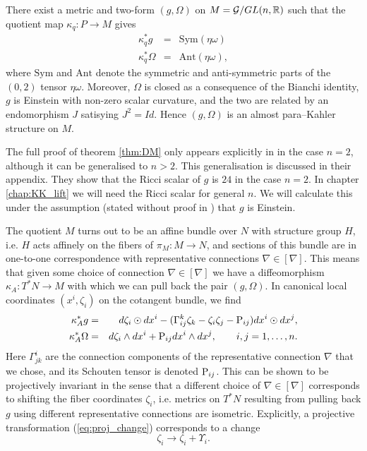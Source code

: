 \begin{theo}{\cite{DM}}\label{thm:DM}
There exist a metric and two-form
$(g,\Omega)$ on $\mbox{\ensuremath{M=\mathcal{G}/GL(n,\mathbb{R})}}$ such
that the quotient map $\kappa_q:P\rightarrow M$ gives
\begin{eqnarray} 
\kappa_q^{*}g & = & \mathrm{Sym}(\eta\omega) \label{eq:g_cartan} \\
\kappa_q^{*}\Omega & = & \mathrm{Ant}(\eta\omega), \label{eq:Omega_cartan}
\end{eqnarray}
where $\mathrm{Sym}$ and $\mathrm{Ant}$ denote the symmetric and
anti-symmetric parts of the $(0,2)$ tensor $\eta\omega$. Moreover,
$\Omega$ is closed as a consequence of the Bianchi identity, $g$
is Einstein with non-zero scalar curvature, and the two are related
by an endomorphism $J$ satisying $J^{2}=Id$. Hence $(g,\Omega)$
is an almost para--Kahler structure on $M$.
\end{theo}


\begin{rmk}
The full proof of theorem \ref{thm:DM} only appears explicitly in \cite{DM} in the case $n=2$, although it can be generalised to $n>2$. This generalisation is discussed in their appendix. They show that the Ricci scalar of $g$ is $24$ in the case $n=2$. In chapter \ref{chap:KK_lift} we will need the Ricci scalar for general $n$. We will calculate this under the assumption (stated without proof in \cite{DM}) that $g$ is Einstein.
\end{rmk}

\begin{rmk}
The quotient $M$ turns out to be an affine bundle over $N$ with
structure group $H$, i.e. $H$ acts affinely on the fibers of $\pi_M:M\rightarrow N$,
and sections of this bundle are in one-to-one correspondence with
representative connections $\nabla\in[\nabla]$. This means that given
some choice of connection $\nabla\in[\nabla]$ we have a diffeomorphism
$\kappa_A:T^{*}N\rightarrow M$ with which we can pull back the pair
$(g,\Omega)$. In canonical local coordinates $(x^{i},\zeta_{i})$ on
the cotangent bundle, we find
\begin{eqnarray}
\kappa_A^{*}g & = &  d\zeta_{i}\odot dx^{i}-(\Gamma_{ij}^{k}\zeta_{k}-\zeta_{i}\zeta_{j}-\mathrm{P}_{ij}) dx^{i}\odot dx^{j},\label{eq:coord_form}\\
\kappa_A^{*}\Omega & = &  d\zeta_{i}\wedge dx^{i}+\mathrm{P}_{ij} dx^{i}\wedge dx^{j},\qquad i,j=1,\dots ,n.\nonumber 
\end{eqnarray}
Here $\Gamma_{jk}^{i}$ are the connection components of the representative
connection $\nabla$ that we chose, and its Schouten tensor is denoted $\mathrm{P}_{ij}$. This can be shown to be projectively invariant
in the sense that a different choice of $\nabla\in[\nabla]$ corresponds
to shifting the fiber coordinates $\zeta_{i}$, i.e. metrics on $T^{*}N$
resulting from pulling back $g$ using different representative connections
are isometric. Explicitly, a projective transformation (\ref{eq:proj_change})
corresponds to a change
\begin{equation}
\zeta_{i}\longrightarrow \zeta_{i}+\Upsilon_{i}.\label{eq:zeta_change}
\end{equation}
\end{rmk}


